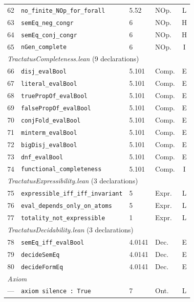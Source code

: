 \documentclass[jsl,bibother]{asl}
\theoremstyle{definition}
\theoremstyle{remark}
\begin{document}
\begin{table}[p]
\begin{tabular}{@{}rlllc@{}}
62 & \texttt{no\_finite\_NOp\_for\_forall}              & 5.52    & NOp. & L \\
63 & \texttt{semEq\_neg\_congr}                         & 6       & NOp. & H \\
64 & \texttt{semEq\_conj\_congr}                        & 6       & NOp. & H \\
65 & \texttt{nGen\_complete}                            & 6       & NOp. & I \\
\midrule
\multicolumn{5}{l}{\emph{TractatusCompleteness.lean} (9 declarations)} \\
\midrule
66 & \texttt{disj\_evalBool}                            & 5.101   & Comp. & E \\
67 & \texttt{literal\_evalBool}                         & 5.101   & Comp. & E \\
68 & \texttt{truePropOf\_evalBool}                      & 5.101   & Comp. & E \\
69 & \texttt{falsePropOf\_evalBool}                     & 5.101   & Comp. & E \\
70 & \texttt{conjFold\_evalBool}                        & 5.101   & Comp. & E \\
71 & \texttt{minterm\_evalBool}                         & 5.101   & Comp. & E \\
72 & \texttt{bigDisj\_evalBool}                         & 5.101   & Comp. & E \\
73 & \texttt{dnf\_evalBool}                             & 5.101   & Comp. & E \\
74 & \texttt{functional\_completeness}                  & 5.101   & Comp. & I \\
\midrule
\multicolumn{5}{l}{\emph{TractatusExpressibility.lean} (3 declarations)} \\
\midrule
75 & \texttt{expressible\_iff\_iff\_invariant}          & 5       & Expr. & L \\
76 & \texttt{eval\_depends\_only\_on\_atoms}            & 5       & Expr. & L \\
77 & \texttt{totality\_not\_expressible}                & 1       & Expr. & L \\
\midrule
\multicolumn{5}{l}{\emph{TractatusDecidability.lean} (3 declarations)} \\
\midrule
78 & \texttt{semEq\_iff\_evalBool}                      & 4.0141  & Dec. & E \\
79 & \texttt{decideSemEq}                               & 4.0141  & Dec. & E \\
80 & \texttt{decideFormEq}                              & 4.0141  & Dec. & E \\
\midrule
\multicolumn{5}{l}{\emph{Axiom}} \\
\midrule
--- & \texttt{axiom silence : True}                      & 7       & Ont. & L \\
\bottomrule
\end{tabular}
\end{table}
\end{document}
